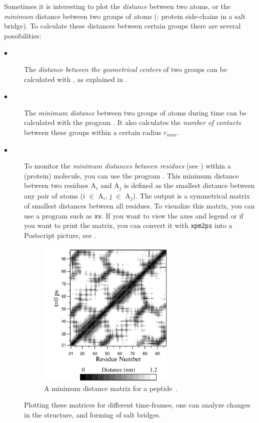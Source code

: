 Sometimes it is interesting to plot the {\em distance} between two atoms,
or the {\em minimum} distance between two groups of atoms
({\eg}: protein side-chains in a salt bridge). 
To calculate these distances between certain groups there are several 
possibilities:
\begin{description}
\item[$\bullet$] 
The {\em distance between the geometrical centers} of two groups can be 
calculated with {\tt {}}, as explained in . 
\item[$\bullet$] 
The {\em minimum distance} between two groups of atoms during time 
can be calculated with the program {\tt {}}. It also calculates the 
{\em number of contacts} between these groups 
within a certain radius $r_{max}$.
\item[$\bullet$] 
To monitor the {\em minimum distances between residues} 
(see ) within a (protein) molecule, you can use 
the program {\tt {}}. This minimum distance between two residues
A$_i$ and A$_j$ is defined as the smallest distance between any pair of 
atoms (i $\in$ A$_i$, j $\in$ A$_j$).
The output is a symmetrical matrix of smallest distances 
between all residues.
To visualize this matrix, you can use a program such as {\tt xv}.
If you want to view the axes and legend or if you want to print
the matrix, you can convert it with 
{\tt xpm2ps} into a Postscript picture, see .
\begin{figure}
\centerline{
\includegraphics[width=6.5cm]{plots/distm}}
\caption{A minimum distance matrix for a peptide~\protect\cite{Spoel96b}.}
\label{fig:mdmat}
\end{figure}

Plotting these matrices for different time-frames, one can analyze changes 
in the structure, and {\eg} forming of salt bridges.
\end{description}


